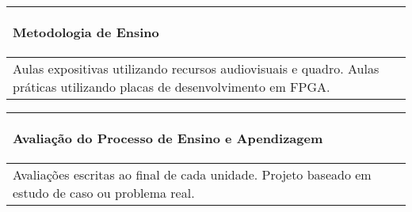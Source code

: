 \begin{table}[h!]
\centering
\begin{small} 
\setlength{\tabcolsep}{3pt} 
\begin{tabular}{|p{15cm}|}\hline

\begin{center}\textbf{Metodologia de Ensino}\end{center}\\ \hline
   Aulas expositivas utilizando recursos audiovisuais e quadro. Aulas práticas utilizando placas de desenvolvimento em FPGA.
 \\ \hline
\end{tabular} 
\end{small}
\label{dadosinstituicao}
\end{table}


\begin{table}[h!]
\centering
\begin{small} 
\setlength{\tabcolsep}{3pt} 
\begin{tabular}{|p{15cm}|}\hline

\begin{center}\textbf{Avaliação do Processo de Ensino e Apendizagem}\end{center}\\ \hline
   Avaliações escritas ao final de cada unidade. Projeto baseado em estudo de caso ou problema real.
 \\ \hline

\end{tabular} 
\end{small}
\label{dadosinstituicao}
\end{table}

